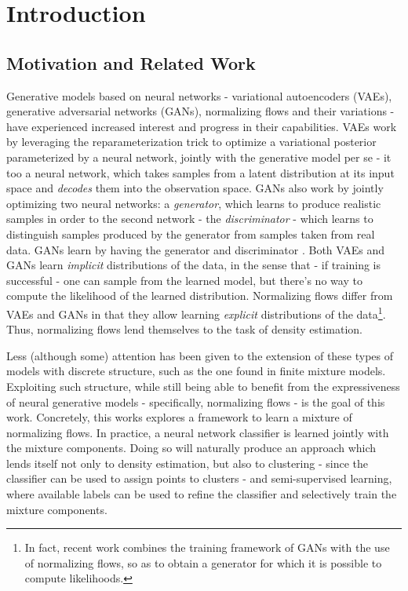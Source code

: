 \section{Introduction}
\label{section:introduction}

\subsection{Motivation and Related Work}
\label{subsection:motivation}

Generative models based on neural networks - variational autoencoders (VAEs),
generative adversarial networks (GANs), normalizing flows and their variations -
have experienced increased interest and progress in their capabilities. VAEs
\autocite{vaepaper} work by leveraging the reparameterization trick to optimize
a variational posterior parameterized by a neural network, jointly with the generative
model per se - it too a neural network, which takes samples from a latent distribution at its
input space and \emph{decodes} them into the observation space. GANs also work by
jointly optimizing two neural networks: a \emph{generator}, which learns to produce
realistic samples in order to  the second network - the \emph{discriminator} - which
learns to distinguish samples produced by the generator from samples taken from real data. GANs learn
by having the generator and discriminator . Both VAEs and GANs learn
\emph{implicit} distributions of the data, in the sense that - if training is
successful - one can sample from the learned model, but there's no way to compute
the likelihood of the learned distribution. Normalizing flows differ from VAEs
and GANs in that they allow learning \emph{explicit} distributions of the
data\footnote{In fact, recent work \autocite{flowgan} combines the training
framework of GANs with the use of normalizing flows, so as to obtain a generator
for which it is possible to compute likelihoods.}. Thus, normalizing flows lend
themselves to the task of density estimation.

Less (although some) attention has been given to the extension of these types
of models with discrete structure, such as the one found in finite mixture models.
Exploiting such structure, while still being able to benefit from the expressiveness
of neural generative models - specifically, normalizing flows - is the goal of this
work. Concretely, this works explores a framework to learn a mixture of normalizing
flows. In practice, a neural network classifier is learned jointly with the mixture
components. Doing so will naturally produce an approach which lends itself not
only to density estimation, but also to clustering - since the classifier can be used
to assign points to clusters - and semi-supervised learning, where available
labels can be used to refine the classifier and selectively train the mixture
components.

